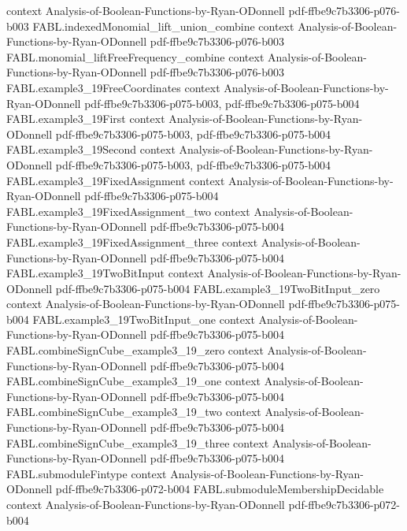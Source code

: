 \begin{theorem}
  {context}
  {Analysis-of-Boolean-Functions-by-Ryan-ODonnell}
  {pdf-ffbe9c7b3306-p076-b003}
\proofstep
  {FABL.indexedMonomial_lift_union_combine}
  {context}
  {Analysis-of-Boolean-Functions-by-Ryan-ODonnell}
  {pdf-ffbe9c7b3306-p076-b003}
\proofstep
  {FABL.monomial_liftFreeFrequency_combine}
  {context}
  {Analysis-of-Boolean-Functions-by-Ryan-ODonnell}
  {pdf-ffbe9c7b3306-p076-b003}
\proofstep
  {FABL.example3_19FreeCoordinates}
  {context}
  {Analysis-of-Boolean-Functions-by-Ryan-ODonnell}
  {pdf-ffbe9c7b3306-p075-b003,
    pdf-ffbe9c7b3306-p075-b004}
\proofstep
  {FABL.example3_19First}
  {context}
  {Analysis-of-Boolean-Functions-by-Ryan-ODonnell}
  {pdf-ffbe9c7b3306-p075-b003,
    pdf-ffbe9c7b3306-p075-b004}
\proofstep
  {FABL.example3_19Second}
  {context}
  {Analysis-of-Boolean-Functions-by-Ryan-ODonnell}
  {pdf-ffbe9c7b3306-p075-b003,
    pdf-ffbe9c7b3306-p075-b004}
\proofstep
  {FABL.example3_19FixedAssignment}
  {context}
  {Analysis-of-Boolean-Functions-by-Ryan-ODonnell}
  {pdf-ffbe9c7b3306-p075-b004}
\proofstep
  {FABL.example3_19FixedAssignment_two}
  {context}
  {Analysis-of-Boolean-Functions-by-Ryan-ODonnell}
  {pdf-ffbe9c7b3306-p075-b004}
\proofstep
  {FABL.example3_19FixedAssignment_three}
  {context}
  {Analysis-of-Boolean-Functions-by-Ryan-ODonnell}
  {pdf-ffbe9c7b3306-p075-b004}
\proofstep
  {FABL.example3_19TwoBitInput}
  {context}
  {Analysis-of-Boolean-Functions-by-Ryan-ODonnell}
  {pdf-ffbe9c7b3306-p075-b004}
\proofstep
  {FABL.example3_19TwoBitInput_zero}
  {context}
  {Analysis-of-Boolean-Functions-by-Ryan-ODonnell}
  {pdf-ffbe9c7b3306-p075-b004}
\proofstep
  {FABL.example3_19TwoBitInput_one}
  {context}
  {Analysis-of-Boolean-Functions-by-Ryan-ODonnell}
  {pdf-ffbe9c7b3306-p075-b004}
\proofstep
  {FABL.combineSignCube_example3_19_zero}
  {context}
  {Analysis-of-Boolean-Functions-by-Ryan-ODonnell}
  {pdf-ffbe9c7b3306-p075-b004}
\proofstep
  {FABL.combineSignCube_example3_19_one}
  {context}
  {Analysis-of-Boolean-Functions-by-Ryan-ODonnell}
  {pdf-ffbe9c7b3306-p075-b004}
\proofstep
  {FABL.combineSignCube_example3_19_two}
  {context}
  {Analysis-of-Boolean-Functions-by-Ryan-ODonnell}
  {pdf-ffbe9c7b3306-p075-b004}
\proofstep
  {FABL.combineSignCube_example3_19_three}
  {context}
  {Analysis-of-Boolean-Functions-by-Ryan-ODonnell}
  {pdf-ffbe9c7b3306-p075-b004}
\proofstep
  {FABL.submoduleFintype}
  {context}
  {Analysis-of-Boolean-Functions-by-Ryan-ODonnell}
  {pdf-ffbe9c7b3306-p072-b004}
\proofstep
  {FABL.submoduleMembershipDecidable}
  {context}
  {Analysis-of-Boolean-Functions-by-Ryan-ODonnell}
  {pdf-ffbe9c7b3306-p072-b004}

\end{theorem}
